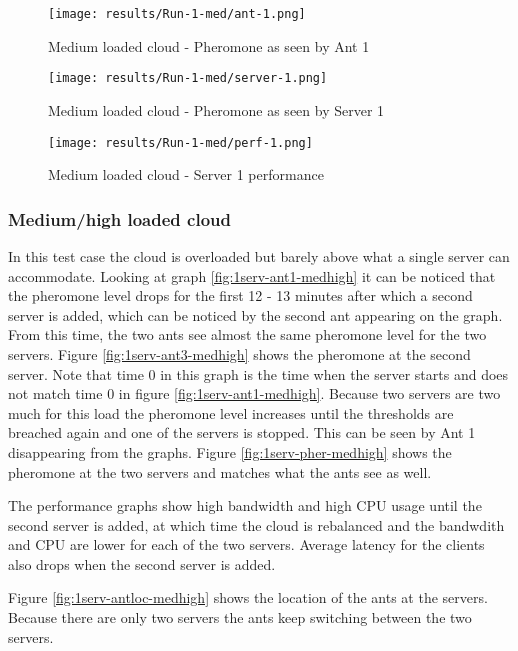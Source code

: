 \begin{figure}[!h]
	\centering
		\texttt{[image: results/Run-1-med/ant-1.png]}
	\caption{Medium loaded cloud - Pheromone as seen by Ant 1}
	\label{fig:1serv-ant-med}
\end{figure}

\begin{figure}
	\centering
		\texttt{[image: results/Run-1-med/server-1.png]}
	\caption{Medium loaded cloud - Pheromone as seen by Server 1}
	\label{fig:1serv-pher-med}
\end{figure}

\begin{figure}
	\centering
		\texttt{[image: results/Run-1-med/perf-1.png]}
	\caption{Medium loaded cloud - Server 1 performance}
	\label{fig:1serv-perf-med}
\end{figure}

\subsubsection{Medium/high loaded cloud}

In this test case the cloud is overloaded but barely above what a single server can accommodate. Looking at graph \ref{fig:1serv-ant1-medhigh} it can be noticed that the pheromone level drops for the first 12 - 13 minutes after which a second server is added, which can be noticed by the second ant appearing on the graph. From this time, the two ants see almost the same pheromone level for the two servers. Figure \ref{fig:1serv-ant3-medhigh} shows the pheromone at the second server. Note that time 0 in this graph is the time when the server starts and does not match time 0 in figure \ref{fig:1serv-ant1-medhigh}. Because two servers are two much for this load the pheromone level increases until the thresholds are breached again and one of the servers is stopped. This can be seen by Ant 1 disappearing from the graphs. Figure \ref{fig:1serv-pher-medhigh} shows the pheromone at the two servers and matches what the ants see as well.

The performance graphs show high bandwidth and high CPU usage until the second server is added, at which time the cloud is rebalanced and the bandwdith and CPU are lower for each of the two servers. Average latency for the clients also drops when the second server is added.

Figure \ref{fig:1serv-antloc-medhigh} shows the location of the ants at the servers. Because there are only two servers the ants keep switching between the two servers.

